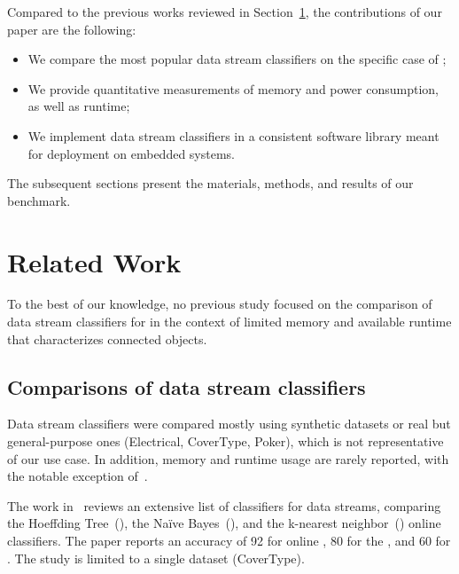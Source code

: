 Compared to the previous works reviewed in Section~\ref{sec:related-work}, the contributions of our paper are the following:
\begin{itemize}
    \item We compare the most popular data stream classifiers on the specific case of \har;
    \item We provide quantitative measurements of memory and power consumption, as well as runtime;
    \item We implement data stream classifiers in a consistent software library meant for deployment on embedded systems.
\end{itemize} 
The subsequent sections present the materials, methods, and results of our benchmark.


\section{Related Work}

\label{sec:related-work}

To the best of our knowledge, no previous study focused on the comparison
of data stream classifiers for \har in the context of limited memory and
available runtime that characterizes connected objects.

\subsection{Comparisons of data stream classifiers}

Data stream classifiers were compared mostly using synthetic datasets
or real but general-purpose ones (Electrical, CoverType, Poker), which is 
not representative of our use case. In addition, memory and runtime usage 
are rarely reported, with the notable exception of~\cite{StreamDM-CPP}.

The work
in~\cite{prasad2016stream} reviews an extensive list of classifiers for
data streams, comparing the Hoeffding Tree~(\hoeffdingtree), the Naïve Bayes~(\naivebayes), and the k-nearest neighbor~(\knn)
online classifiers. The paper reports an accuracy of 92 for online \knn, 80
for the \hoeffdingtree, and 60 for \naivebayes. The study is limited to a
single dataset (CoverType). 

